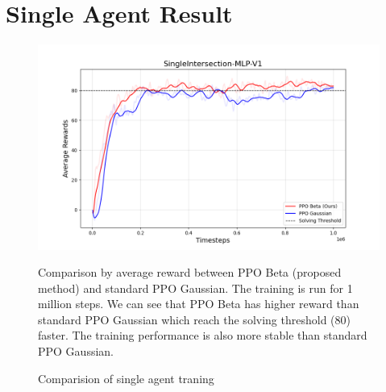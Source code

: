 \section{Single Agent Result}\label{sec:single-agent-result}
\begin{figure}[H]
    \centering
    \includegraphics[width=14cm]{assets/ppo_single}
    \caption{Comparision of single agent traning}\label{fig:single_agent_training_reward}
    \medskip
    \small Comparison by average reward between PPO Beta (proposed method) and standard PPO Gaussian.
    The training is run for 1 million steps. We can see that PPO Beta has higher reward than standard PPO Gaussian which reach the solving threshold (80) faster.
    The training performance is also more stable than standard PPO Gaussian.
\end{figure}
